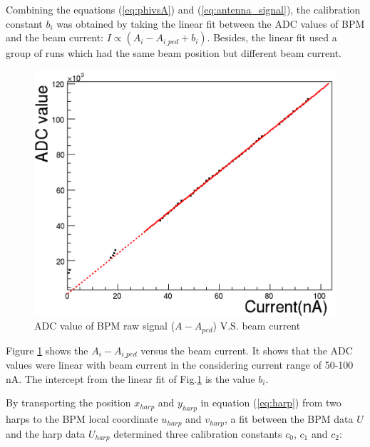 \documentclass[english,review,number,sort&compress]{elsarticle}
\begin{document}
Combining the equations (\ref{eq:phivsA}) and (\ref{eq:antenna_signal}), the calibration constant $b_{i}$ was obtained by taking the linear fit between the ADC values of BPM and the beam current: $I\propto(A_{i}-A_{i\_ped}+b_{i})$. Besides, the linear fit used a group of runs which had the same beam position but different beam current.
\begin{figure}[tbph]
\begin{centering}
\includegraphics[width=0.5\columnwidth]{currvspos} 
\par\end{centering}

\protect\caption{\label{fig:BPM-raw-signalVScurrent}ADC value of BPM raw signal ($A-A_{ped}$) V.S. beam current}
\end{figure}
 Figure \ref{fig:BPM-raw-signalVScurrent} shows the $A_{i}-A_{i\_ped}$ versus the beam current. It shows that the ADC values were linear with beam current in the considering current range of 50-100 nA. The intercept from the linear fit of Fig.\ref{fig:BPM-raw-signalVScurrent} is the value $b_{i}$. 

By transporting the position $x_{harp}$ and $y_{harp}$ in equation (\ref{eq:harp}) from two harps to the BPM local coordinate $u_{harp}$ and $v_{harp}$, a fit between the BPM data $U$ and the harp data $U_{harp}$ determined three calibration constants $c_{0}$, $c_{1}$ and $c_{2}$:
\end{document}
